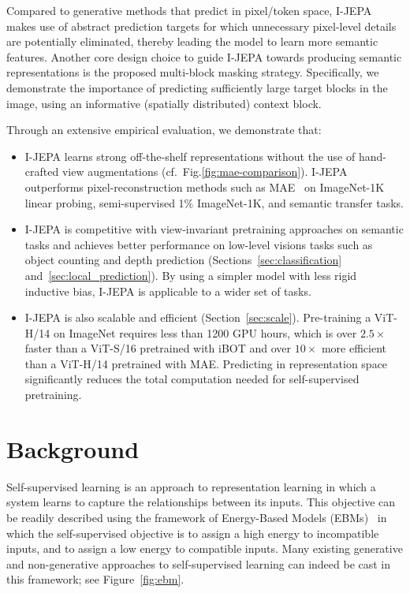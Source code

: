 \documentclass[10pt,twocolumn,letterpaper]{article}
\newcommand{\putalg}{{I-JEPA}\xspace}
\begin{document}
Compared to generative methods that predict in pixel/token space, \putalg makes use of abstract prediction targets for which unnecessary pixel-level details are potentially eliminated, thereby leading the model to learn more semantic features.
Another core design choice to guide \putalg towards producing semantic representations is the proposed multi-block masking strategy. Specifically, we demonstrate the importance of predicting sufficiently large target blocks in the image, using an informative (spatially distributed) context block.

Through an extensive empirical evaluation, we demonstrate that:
\begin{itemize}
\item \putalg learns strong off-the-shelf representations without the use of hand-crafted view augmentations (cf.~Fig.\ref{fig:mae-comparison}).
\putalg outperforms pixel-reconstruction methods such as MAE~\cite{he2021masked} on ImageNet-1K linear probing, semi-supervised 1\% ImageNet-1K, and semantic transfer tasks. 

\item \putalg is competitive with view-invariant pretraining approaches on semantic tasks and achieves better performance on low-level visions tasks such as object counting and depth prediction (Sections~\ref{sec:classification} and~\ref{sec:local_prediction}). By using a simpler model with less rigid inductive bias, \putalg is applicable to a wider set of tasks.

\item \putalg is also scalable and efficient (Section~\ref{sec:scale}). Pre-training a ViT-H/14 on ImageNet requires less than 1200 GPU hours, which is over $2.5\times$ faster than a ViT-S/16 pretrained with iBOT\cite{zhou2021ibotyes} and over $10\times$ more efficient than a ViT-H/14 pretrained with MAE. Predicting in representation space significantly reduces the total computation needed for self-supervised pretraining.
\end{itemize}

\section{Background}
\label{sec:background}

Self-supervised learning is an approach to representation learning in which a system learns to capture the relationships between its inputs.
This objective can be readily described using the framework of Energy-Based Models (EBMs)~\cite{lecun2006tutorial} in which the self-supervised objective is to assign a high energy to incompatible inputs, and to assign a low energy to compatible inputs.
Many existing generative and non-generative approaches to self-supervised learning can indeed be cast in this framework; see Figure~\ref{fig:ebm}.
\end{document}
